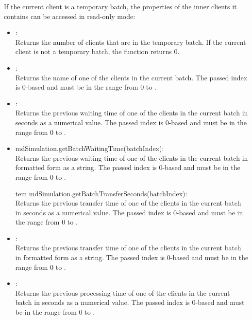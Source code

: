 If the current client is a temporary batch, the properties of the inner clients
it contains can be accessed in read-only mode:

\begin{itemize}
\item
{}:\\
Returns the number of clients that are in the temporary batch.  
If the current client is not a temporary batch, the function returns 0.

\item
{}:\\
Returns the name of one of the clients in the current batch.
The passed index is 0-based and must be in the range from 0 to .

\item
{}:\\
Returns the previous waiting time of one of the clients in the current batch in seconds as a numerical value.
The passed index is 0-based and must be in the range from 0 to .


\item
md{Simulation.getBatchWaitingTime(batchIndex)}:\\
Returns the previous waiting time of one of the clients in the current batch in formatted form as a string.
The passed index is 0-based and must be in the range from 0 to .


tem
md{Simulation.getBatchTransferSeconds(batchIndex)}:\\
Returns the previous transfer time of one of the clients in the current batch in seconds as a numerical value.
The passed index is 0-based and must be in the range from 0 to .


\item
{}:\\
Returns the previous transfer time of one of the clients in the current batch in formatted form as a string.
The passed index is 0-based and must be in the range from 0 to .

\item
{}:\\
Returns the previous processing time of one of the clients in the current batch in seconds as a numerical value.
The passed index is 0-based and must be in the range from 0 to .


\end{itemize}
